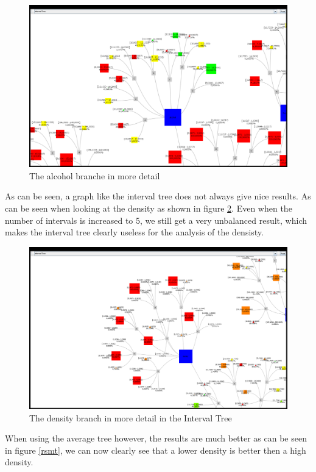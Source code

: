 \documentclass[a4paper,twoside,11pt]{article}
\begin{document}
\begin{figure}[!h]
  \centering
  \includegraphics[width=\textwidth]{images/20131105034138plot.png}
  \caption{The alcohol branche in more detail}
  \label{ait}
\end{figure}

As can be seen, a graph like the interval tree does not always give nice results. As can be seen when looking at the density as shown in figure \ref{rsit}. Even when the number of intervals is increased to 5, we still get a very unbalanced result, which makes the interval tree clearly useless for the analysis of the densisty.

\begin{figure}[!h]
  \centering
  \includegraphics[width=\textwidth]{images/20131105041005plot.png}
  \caption{The density branch in more detail in the Interval Tree}
  \label{rsit}
\end{figure}

When using the average tree however, the results are much better as can be seen in figure \ref{rsmt}, we can now clearly see that a lower density is better then a high density.
\end{document}
